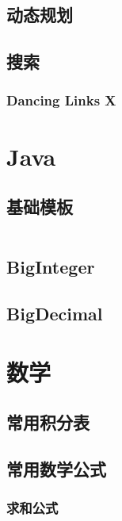 \documentclass[a4paper]{article}
\newcommand{\cppcode}[1]{
    \inputminted[mathescape]{cpp}{source/#1}
}
\newcommand{\javacode}[1]{
    \inputminted[mathescape]{java}{source/#1}
}
\begin{document}
\cppcode{miscellany/what-day-is-today.cpp}

\subsection{动态规划}

\subsection{搜索}

\subsubsection{Dancing Links X}

\section{Java}

\subsection{基础模板}

\javacode{template.java}

\subsection{BigInteger}

\subsection{BigDecimal}

\section{数学}

\subsection{常用积分表}

\subsection{常用数学公式}

\subsubsection{求和公式}
\end{document}
